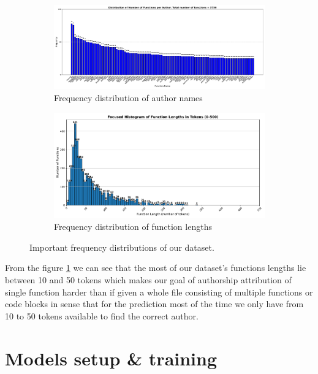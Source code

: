\documentclass[conference]{IEEEtran}
\begin{document}
\begin{figure}[!t]
    \centering
    \begin{subfigure}{0.48\textwidth}
        \centering
        \includegraphics[width=\linewidth]{figures/distribution_names.pdf}
        \caption{Frequency distribution of author names}
        \label{fig:distr_names}
    \end{subfigure}
    \hfill
    \begin{subfigure}{0.48\textwidth}
        \centering
        \includegraphics[width=\linewidth]{figures/distr_lens_tokens.pdf}
        \caption{Frequency distribution of function lengths}
        \label{fig:disrt_lens}
    \end{subfigure}
    \caption{Important frequency distributions of our dataset.}
    \label{fig:eda_distr}
\end{figure}

From the figure \ref{fig:distr_names} we can see that the most of our dataset's 
functions lengths lie between 10 and 50 tokens which makes our goal of authorship attribution of single function
harder than if given a whole file consisting of multiple functions or code blocks in sense that for the prediction
most of the time we only have from 10 to 50 tokens available to find the correct author.

\section{Models setup \& training}
\end{document}
